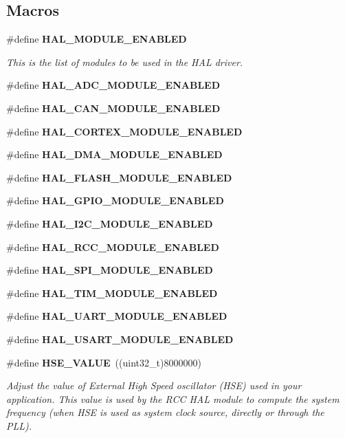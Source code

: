 \subsection*{Macros}
\begin{DoxyCompactItemize}
\item 
\#define \textbf{ H\+A\+L\+\_\+\+M\+O\+D\+U\+L\+E\+\_\+\+E\+N\+A\+B\+L\+ED}
\begin{DoxyCompactList}\small\item\em This is the list of modules to be used in the H\+AL driver. \end{DoxyCompactList}\item 
\#define \textbf{ H\+A\+L\+\_\+\+A\+D\+C\+\_\+\+M\+O\+D\+U\+L\+E\+\_\+\+E\+N\+A\+B\+L\+ED}
\item 
\#define \textbf{ H\+A\+L\+\_\+\+C\+A\+N\+\_\+\+M\+O\+D\+U\+L\+E\+\_\+\+E\+N\+A\+B\+L\+ED}
\item 
\#define \textbf{ H\+A\+L\+\_\+\+C\+O\+R\+T\+E\+X\+\_\+\+M\+O\+D\+U\+L\+E\+\_\+\+E\+N\+A\+B\+L\+ED}
\item 
\#define \textbf{ H\+A\+L\+\_\+\+D\+M\+A\+\_\+\+M\+O\+D\+U\+L\+E\+\_\+\+E\+N\+A\+B\+L\+ED}
\item 
\#define \textbf{ H\+A\+L\+\_\+\+F\+L\+A\+S\+H\+\_\+\+M\+O\+D\+U\+L\+E\+\_\+\+E\+N\+A\+B\+L\+ED}
\item 
\#define \textbf{ H\+A\+L\+\_\+\+G\+P\+I\+O\+\_\+\+M\+O\+D\+U\+L\+E\+\_\+\+E\+N\+A\+B\+L\+ED}
\item 
\#define \textbf{ H\+A\+L\+\_\+\+I2\+C\+\_\+\+M\+O\+D\+U\+L\+E\+\_\+\+E\+N\+A\+B\+L\+ED}
\item 
\#define \textbf{ H\+A\+L\+\_\+\+R\+C\+C\+\_\+\+M\+O\+D\+U\+L\+E\+\_\+\+E\+N\+A\+B\+L\+ED}
\item 
\#define \textbf{ H\+A\+L\+\_\+\+S\+P\+I\+\_\+\+M\+O\+D\+U\+L\+E\+\_\+\+E\+N\+A\+B\+L\+ED}
\item 
\#define \textbf{ H\+A\+L\+\_\+\+T\+I\+M\+\_\+\+M\+O\+D\+U\+L\+E\+\_\+\+E\+N\+A\+B\+L\+ED}
\item 
\#define \textbf{ H\+A\+L\+\_\+\+U\+A\+R\+T\+\_\+\+M\+O\+D\+U\+L\+E\+\_\+\+E\+N\+A\+B\+L\+ED}
\item 
\#define \textbf{ H\+A\+L\+\_\+\+U\+S\+A\+R\+T\+\_\+\+M\+O\+D\+U\+L\+E\+\_\+\+E\+N\+A\+B\+L\+ED}
\item 
\#define \textbf{ H\+S\+E\+\_\+\+V\+A\+L\+UE}~((uint32\+\_\+t)8000000)
\begin{DoxyCompactList}\small\item\em Adjust the value of External High Speed oscillator (H\+SE) used in your application. This value is used by the R\+CC H\+AL module to compute the system frequency (when H\+SE is used as system clock source, directly or through the P\+LL). ~\newline

\end{DoxyCompactList}
\end{DoxyCompactItemize}
